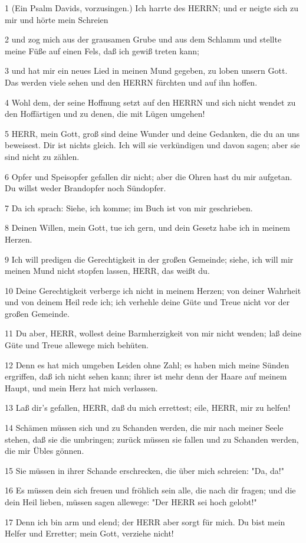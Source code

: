 \par 1 (Ein Psalm Davids, vorzusingen.) Ich harrte des HERRN; und er neigte sich zu mir und hörte mein Schreien
\par 2 und zog mich aus der grausamen Grube und aus dem Schlamm und stellte meine Füße auf einen Fels, daß ich gewiß treten kann;
\par 3 und hat mir ein neues Lied in meinen Mund gegeben, zu loben unsern Gott. Das werden viele sehen und den HERRN fürchten und auf ihn hoffen.
\par 4 Wohl dem, der seine Hoffnung setzt auf den HERRN und sich nicht wendet zu den Hoffärtigen und zu denen, die mit Lügen umgehen!
\par 5 HERR, mein Gott, groß sind deine Wunder und deine Gedanken, die du an uns beweisest. Dir ist nichts gleich. Ich will sie verkündigen und davon sagen; aber sie sind nicht zu zählen.
\par 6 Opfer und Speisopfer gefallen dir nicht; aber die Ohren hast du mir aufgetan. Du willst weder Brandopfer noch Sündopfer.
\par 7 Da ich sprach: Siehe, ich komme; im Buch ist von mir geschrieben.
\par 8 Deinen Willen, mein Gott, tue ich gern, und dein Gesetz habe ich in meinem Herzen.
\par 9 Ich will predigen die Gerechtigkeit in der großen Gemeinde; siehe, ich will mir meinen Mund nicht stopfen lassen, HERR, das weißt du.
\par 10 Deine Gerechtigkeit verberge ich nicht in meinem Herzen; von deiner Wahrheit und von deinem Heil rede ich; ich verhehle deine Güte und Treue nicht vor der großen Gemeinde.
\par 11 Du aber, HERR, wollest deine Barmherzigkeit von mir nicht wenden; laß deine Güte und Treue allewege mich behüten.
\par 12 Denn es hat mich umgeben Leiden ohne Zahl; es haben mich meine Sünden ergriffen, daß ich nicht sehen kann; ihrer ist mehr denn der Haare auf meinem Haupt, und mein Herz hat mich verlassen.
\par 13 Laß dir's gefallen, HERR, daß du mich errettest; eile, HERR, mir zu helfen!
\par 14 Schämen müssen sich und zu Schanden werden, die mir nach meiner Seele stehen, daß sie die umbringen; zurück müssen sie fallen und zu Schanden werden, die mir Übles gönnen.
\par 15 Sie müssen in ihrer Schande erschrecken, die über mich schreien: "Da, da!"
\par 16 Es müssen dein sich freuen und fröhlich sein alle, die nach dir fragen; und die dein Heil lieben, müssen sagen allewege: "Der HERR sei hoch gelobt!"
\par 17 Denn ich bin arm und elend; der HERR aber sorgt für mich. Du bist mein Helfer und Erretter; mein Gott, verziehe nicht!

